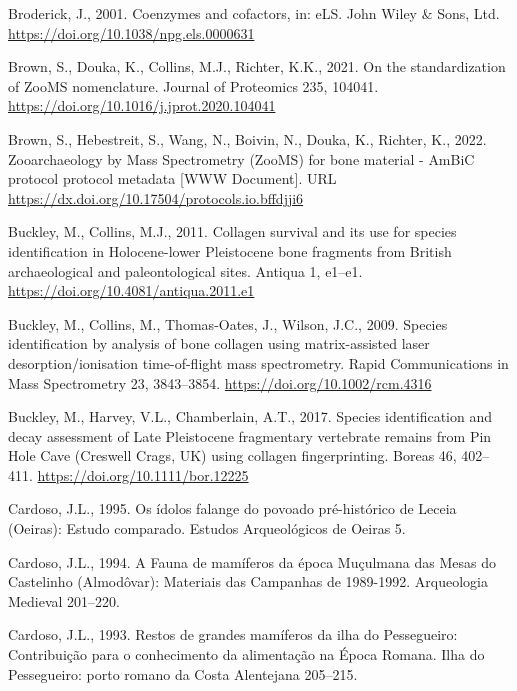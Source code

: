 \documentclass[preprint, 3p, authoryear]{elsarticle} %
\newlength{\cslhangindent}
\newlength{\cslentryspacingunit} %
\newenvironment{CSLReferences}[2] %
 {%
  \setlength{\parindent}{0pt}
  \ifodd #1
  \let\oldpar\par
  \def\par{\hangindent=\cslhangindent\oldpar}
  \fi
  \setlength{\parskip}{#2\cslentryspacingunit}
 }%
 {}
\begin{document}
\begin{CSLReferences}{1}{0}
\leavevmode{}%
Broderick, J., 2001. Coenzymes and cofactors, in: {eLS}. {John Wiley \& Sons, Ltd}. \url{https://doi.org/10.1038/npg.els.0000631}

\leavevmode{}%
Brown, S., Douka, K., Collins, M.J., Richter, K.K., 2021. On the standardization of {ZooMS} nomenclature. Journal of Proteomics 235, 104041. \url{https://doi.org/10.1016/j.jprot.2020.104041}

\leavevmode{}%
Brown, S., Hebestreit, S., Wang, N., Boivin, N., Douka, K., Richter, K., 2022. Zooarchaeology by {Mass Spectrometry} ({ZooMS}) for bone material - {AmBiC} protocol protocol metadata {[}WWW Document{]}. URL \url{https://dx.doi.org/10.17504/protocols.io.bffdjji6}

\leavevmode{}%
Buckley, M., Collins, M.J., 2011. Collagen survival and its use for species identification in {Holocene-lower Pleistocene} bone fragments from {British} archaeological and paleontological sites. Antiqua 1, e1--e1. \url{https://doi.org/10.4081/antiqua.2011.e1}

\leavevmode{}%
Buckley, M., Collins, M., Thomas‐Oates, J., Wilson, J.C., 2009. Species identification by analysis of bone collagen using matrix-assisted laser desorption/ionisation time-of-flight mass spectrometry. Rapid Communications in Mass Spectrometry 23, 3843--3854. \url{https://doi.org/10.1002/rcm.4316}

\leavevmode{}%
Buckley, M., Harvey, V.L., Chamberlain, A.T., 2017. Species identification and decay assessment of {Late Pleistocene} fragmentary vertebrate remains from {Pin Hole Cave} ({Creswell Crags}, {UK}) using collagen fingerprinting. Boreas 46, 402--411. \url{https://doi.org/10.1111/bor.12225}

\leavevmode{}%
Cardoso, J.L., 1995. Os ídolos falange do povoado pré-histórico de {Leceia} ({Oeiras}): Estudo comparado. Estudos Arqueológicos de Oeiras 5.

\leavevmode{}%
Cardoso, J.L., 1994. A {Fauna} de mamíferos da época {Muçulmana} das {Mesas} do {Castelinho} ({Almodôvar}): {Materiais} das {Campanhas} de 1989-1992. Arqueologia Medieval 201--220.

\leavevmode{}%
Cardoso, J.L., 1993. Restos de grandes mamíferos da ilha do {Pessegueiro}: Contribuição para o conhecimento da alimentação na {Época Romana}. Ilha do Pessegueiro: porto romano da Costa Alentejana 205--215.


\end{CSLReferences}
\end{document}
